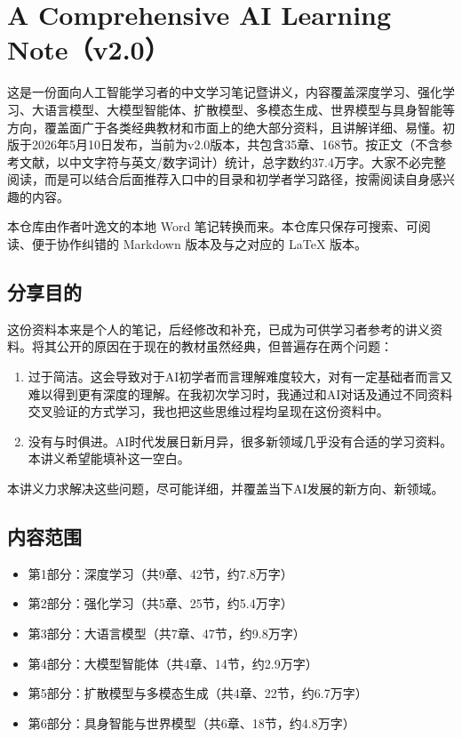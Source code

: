 \hypertarget{a-comprehensive-ai-learning-notev2.0}{%
\chapter{A Comprehensive AI Learning Note（v2.0）}\label{a-comprehensive-ai-learning-notev2.0}}

这是一份面向人工智能学习者的中文学习笔记暨讲义，内容覆盖深度学习、强化学习、大语言模型、大模型智能体、扩散模型、多模态生成、世界模型与具身智能等方向，覆盖面广于各类经典教材和市面上的绝大部分资料，且讲解详细、易懂。初版于2026年5月10日发布，当前为v2.0版本，共包含35章、168节。按正文（不含参考文献，以中文字符与英文/数字词计）统计，总字数约37.4万字。大家不必完整阅读，而是可以结合后面推荐入口中的目录和初学者学习路径，按需阅读自身感兴趣的内容。

本仓库由作者叶逸文的本地 Word 笔记转换而来。本仓库只保存可搜索、可阅读、便于协作纠错的 Markdown 版本及与之对应的 LaTeX 版本。

\hypertarget{ux5206ux4eabux76eeux7684}{%
\section{分享目的}\label{ux5206ux4eabux76eeux7684}}

这份资料本来是个人的笔记，后经修改和补充，已成为可供学习者参考的讲义资料。将其公开的原因在于现在的教材虽然经典，但普遍存在两个问题：

\begin{enumerate}
\def\labelenumi{\arabic{enumi}.}
\item
  过于简洁。这会导致对于AI初学者而言理解难度较大，对有一定基础者而言又难以得到更有深度的理解。在我初次学习时，我通过和AI对话及通过不同资料交叉验证的方式学习，我也把这些思维过程均呈现在这份资料中。
\item
  没有与时俱进。AI时代发展日新月异，很多新领域几乎没有合适的学习资料。本讲义希望能填补这一空白。
\end{enumerate}

本讲义力求解决这些问题，尽可能详细，并覆盖当下AI发展的新方向、新领域。

\hypertarget{ux5185ux5bb9ux8303ux56f4}{%
\section{内容范围}\label{ux5185ux5bb9ux8303ux56f4}}

\begin{itemize}
\tightlist
\item
  第1部分：深度学习（共9章、42节，约7.8万字）
\item
  第2部分：强化学习（共5章、25节，约5.4万字）
\item
  第3部分：大语言模型（共7章、47节，约9.8万字）
\item
  第4部分：大模型智能体（共4章、14节，约2.9万字）
\item
  第5部分：扩散模型与多模态生成（共4章、22节，约6.7万字）
\item
  第6部分：具身智能与世界模型（共6章、18节，约4.8万字）
\end{itemize}

